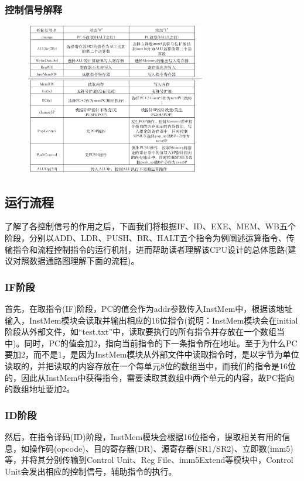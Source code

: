 \documentclass{article}
\begin{document}
\subsubsection{控制信号解释}
    \begin{figure}[H]
        \centering
        \includegraphics[width=0.7\textwidth]{pic/9.png}
        \end{figure}

\subsection{运行流程}
了解了各控制信号的作用之后，下面我们将根据IF、ID、EXE、MEM、WB五个阶段，分别以ADD、LDR、PUSH、BR、HALT五个指令为例阐述运算指令、传输指令和流程控制指令的运行机制，进而帮助读者理解该CPU设计的总体思路(建议对照数据通路图理解下面的流程)。

\subsubsection{IF阶段}
首先，在取指令(IF)阶段，PC的值会作为addr参数传入InstMem中，根据该地址输入，InstMem模块会读取并输出相应的16位指令(说明：InstMem模块会在initial阶段从外部文件，如“test.txt”中，读取要执行的所有指令并存放在一个数组当中)。同时，PC的值会加2，指向当前指令的下一条指令所在地址。至于为什么PC要加2，而不是1，是因为InstMem模块从外部文件中读取指令时，是以字节为单位读取的，并把读取的内容存放在一个每单元8位的数组当中，而我们的指令是16位的，因此从InstMem中获得指令，需要读取其数组中两个单元的内容，故PC指向的数组地址要加2。

\subsubsection{ID阶段}
然后，在指令译码(ID)阶段，InstMem模块会根据16位指令，提取相关有用的信息，如操作码(opcode)、目的寄存器(DR)、源寄存器(SR1/SR2)、立即数(imm5)等，并将其分别传输到Control Unit、Reg File、imm5Extend等模块中，Control Unit会发出相应的控制信号，辅助指令的执行。
\end{document}
